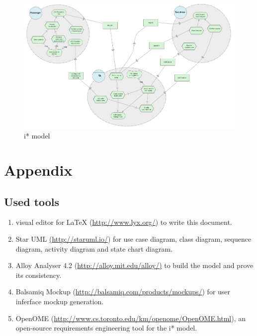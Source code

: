 \begin{landscape}

\begin{figure}
\includegraphics[scale=0.4]{appendix/istarmodeling}

\protect\caption{i{*} model}
\end{figure}


\end{landscape}

\clearpage{}

\section{Appendix} \label{sec:Appendix1}


\subsection*{Used tools}
\begin{enumerate}
\item \LyX{} visual editor for \LaTeX{} (\url{http://www.lyx.org/}) to
write this document.
\item Star UML \url{(http://staruml.io/}) for use case diagram, class diagram,
sequence diagram, activity diagram and state chart diagram.
\item Alloy Analyser 4.2 (\url{http://alloy.mit.edu/alloy/)} to build the
model and prove its consistency.
\item Balsamiq Mockup (\url{http://balsamiq.com/products/mockups/}) for
user inferface mockup generation.
\item OpenOME (\url{http://www.cs.toronto.edu/km/openome/OpenOME.html}),
an open-source requirements engineering tool for the i{*} model.
\end{enumerate}

